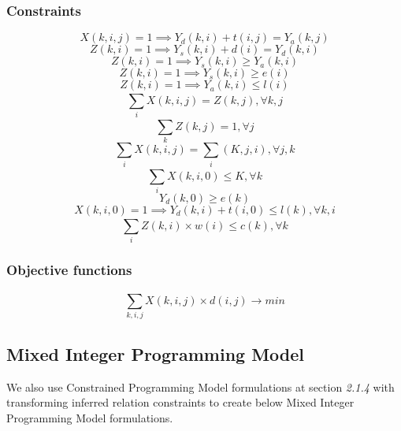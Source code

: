 \subsubsection{Constraints}
	\begin{equation}
		X(k, i, j) = 1 \implies Y_{d}(k, i) + t(i, j) = Y_{a}(k, j)
	\end{equation}
	\begin{equation}
		Z(k, i) = 1 \implies Y_{s}(k, i) + d(i) = Y_{d}(k, i)
	\end{equation}
	\begin{equation}
		Z(k, i) = 1 \implies Y_{s}(k, i) \geq Y_{a}(k, i)
	\end{equation}
	\begin{equation}
		Z(k, i) = 1 \implies Y_{s}(k, i) \geq e(i)
	\end{equation}
	\begin{equation}
		Z(k, i) = 1 \implies Y_{a}(k, i) \leq l(i)
	\end{equation}
	\begin{equation}
		\sum_{i}^{} X(k, i, j) = Z(k, j), \forall k, j
	\end{equation}
	\begin{equation}
		\sum_{k}^{} Z(k, j) = 1, \forall j
	\end{equation}
	\begin{equation}
		\sum_{i} X(k, i, j) = \sum_{i} (K, j, i), \forall j, k
	\end{equation}
	\begin{equation}
		\sum_{i}^{} X(k, i, 0) \leq K, \forall k
	\end{equation}
	\begin{equation}
		Y_{d} (k, 0) \geq e(k)
	\end{equation}
	\begin{equation}
		X(k, i, 0) = 1 \implies Y_{d} (k, i) + t(i, 0) \leq l(k), \forall k, i
	\end{equation}
	\begin{equation}
		\sum_{i}^{} Z(k, i) \times w(i) \leq c(k), \forall k
	\end{equation}
\subsubsection{Objective functions}
	\begin{equation}
		\sum_{k, i, j}^{} X(k, i, j) \times d(i, j) \rightarrow min
	\end{equation}
\subsection{Mixed Integer Programming Model}
We also use Constrained Programming Model formulations at section \emph{2.1.4} with transforming inferred relation constraints to create below Mixed Integer Programming Model formulations.
